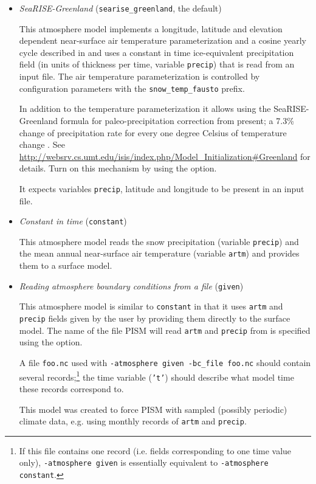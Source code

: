 \begin{itemize}
  \item \emph{SeaRISE-Greenland} (\texttt{searise_greenland}, the default)

    This atmosphere model implements a longitude, latitude and elevation dependent near-surface air temperature parameterization and a cosine yearly cycle described in \cite{Faustoetal2009} and uses a constant in time ice-equivalent precipitation field (in units of thickness per time, variable \texttt{precip}) that is read from an input file.  The air temperature parameterization is controlled by configuration parameters with the \texttt{snow_temp_fausto} prefix.

    In addition to the temperature parameterization it allows using the SeaRISE-Greenland formula for paleo-precipitation correction from present; a 7.3\% change of precipitation rate for every one degree Celsius of temperature change \cite{Huybrechts02}.  See \url{http://websrv.cs.umt.edu/isis/index.php/Model_Initialization#Greenland} for details.  Turn on this mechanism by using the  option.

    It expects variables \texttt{precip}, latitude and longitude to be present in an input file.

 \item \emph{Constant in time} (\texttt{constant})

    This atmosphere model reads the snow precipitation (variable \texttt{precip}) and the mean annual near-surface air temperature (variable \texttt{artm}) and provides them to a surface model.

  \item \emph{Reading atmosphere boundary conditions from a file} (\texttt{given})

    This atmosphere model is similar to \texttt{constant} in that it uses \texttt{artm} and \texttt{precip} fields given by the user by providing them directly to the surface model. The name of the file PISM will read \texttt{artm} and \texttt{precip} from is specified using the  option.

    A file \texttt{foo.nc} used with \texttt{-atmosphere given -bc_file foo.nc} should contain several records;\footnote{If this file contains one record (i.e. fields corresponding to one time value only), \texttt{-atmosphere given} is essentially equivalent to \texttt{-atmosphere constant}.} the time variable (\texttt{'t'}) should describe what model time these records correspond to.

    This model was created to force PISM with sampled (possibly periodic) climate data, e.g. using monthly records of \texttt{artm} and \texttt{precip}.

  \end{itemize}

